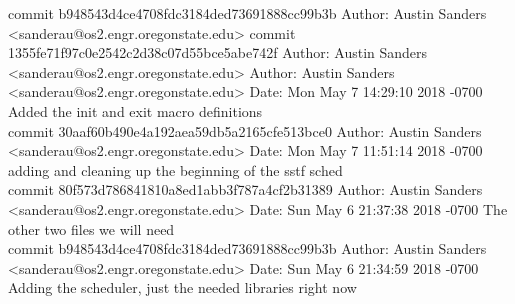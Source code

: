 \documentclass[onecolumn, draftclsnofoot,10pt, compsoc]{IEEEtran}
\begin{document}
{commit b948543d4ce4708fdc3184ded73691888cc99b3b
Author: Austin Sanders <sanderau@os2.engr.oregonstate.edu>
commit 1355fe71f97c0e2542c2d38c07d55bce5abe742f
Author: Austin Sanders <sanderau@os2.engr.oregonstate.edu>
Author: Austin Sanders <sanderau@os2.engr.oregonstate.edu>
Date:   Mon May 7 14:29:10 2018 -0700
Added the init and exit macro definitions\\

commit 30aaf60b490e4a192aea59db5a2165cfe513bce0
Author: Austin Sanders <sanderau@os2.engr.oregonstate.edu>
Date:   Mon May 7 11:51:14 2018 -0700
adding and cleaning up the beginning of the sstf sched\\

commit 80f573d786841810a8ed1abb3f787a4cf2b31389
Author: Austin Sanders <sanderau@os2.engr.oregonstate.edu>
Date:   Sun May 6 21:37:38 2018 -0700
The other two files we will need\\

commit b948543d4ce4708fdc3184ded73691888cc99b3b
Author: Austin Sanders <sanderau@os2.engr.oregonstate.edu>
Date:   Sun May 6 21:34:59 2018 -0700
Adding the scheduler, just the needed libraries right now\\
}
		
        
        
        
\end{document}
